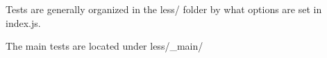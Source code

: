 Tests are generally organized in the {\ttfamily less/} folder by what options are set in index.\+js.

The main tests are located under {\ttfamily less/\+\_\+main/} 